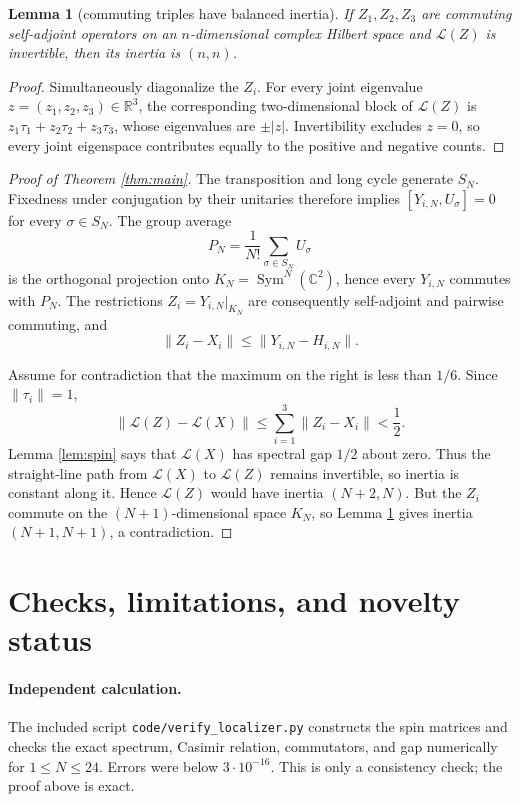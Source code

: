 \documentclass[11pt]{article}
\newtheorem{lemma}{Lemma}
\newcommand{\C}{\mathbb C}
\newcommand{\Sym}{\operatorname{Sym}}
\begin{document}
\begin{lemma}[commuting triples have balanced inertia]\label{lem:balanced}
If $Z_1,Z_2,Z_3$ are commuting self-adjoint operators on an $n$-dimensional
complex Hilbert space and $\mathcal L(Z)$ is invertible, then its inertia is
$(n,n)$.
\end{lemma}

\begin{proof}
Simultaneously diagonalize the $Z_i$.  For every joint eigenvalue
$z=(z_1,z_2,z_3)\in\mathbb R^3$, the corresponding two-dimensional block of
$\mathcal L(Z)$ is $z_1\tau_1+z_2\tau_2+z_3\tau_3$, whose eigenvalues are
$\pm|z|$.  Invertibility excludes $z=0$, so every joint eigenspace contributes
equally to the positive and negative counts.
\end{proof}

\begin{proof}[Proof of Theorem \ref{thm:main}]
The transposition and long cycle generate $S_N$.  Fixedness under conjugation
by their unitaries therefore implies $[Y_{i,N},U_\sigma]=0$ for every
$\sigma\in S_N$.  The group average
\[
 P_N=\frac1{N!}\sum_{\sigma\in S_N}U_\sigma
\]
is the orthogonal projection onto $K_N=\Sym^N(\C^2)$, hence every $Y_{i,N}$
commutes with $P_N$.  The restrictions
$Z_i=Y_{i,N}|_{K_N}$ are consequently self-adjoint and pairwise commuting,
and
\[
 \|Z_i-X_i\|\le \|Y_{i,N}-H_{i,N}\|.
\]

Assume for contradiction that the maximum on the right is less than $1/6$.
Since $\|\tau_i\|=1$,
\[
 \|\mathcal L(Z)-\mathcal L(X)\|
 \le\sum_{i=1}^3\|Z_i-X_i\|<\frac12.
\]
Lemma \ref{lem:spin} says that $\mathcal L(X)$ has spectral gap $1/2$ about
zero.  Thus the straight-line path from $\mathcal L(X)$ to $\mathcal L(Z)$
remains invertible, so inertia is constant along it.  Hence
$\mathcal L(Z)$ would have inertia $(N+2,N)$.  But the $Z_i$ commute on the
$(N+1)$-dimensional space $K_N$, so Lemma \ref{lem:balanced} gives inertia
$(N+1,N+1)$, a contradiction.
\end{proof}

\section{Checks, limitations, and novelty status}

\paragraph{Independent calculation.}
The included script \texttt{code/verify\_localizer.py} constructs the
spin matrices and checks the exact spectrum, Casimir relation, commutators,
and gap numerically for $1\le N\le24$.  Errors were below
$3\cdot10^{-16}$.  This is only a consistency check; the proof above is exact.
\end{document}
